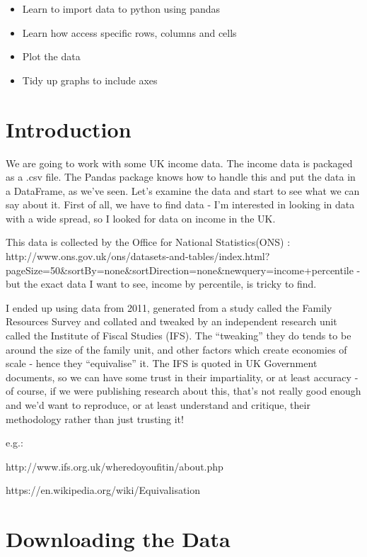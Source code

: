 \documentclass[
  letterpaper,
  DIV=11,
  numbers=noendperiod]{scrreprt}
\providecommand{\tightlist}{%
  \setlength{\itemsep}{0pt}\setlength{\parskip}{0pt}}\usepackage{longtable,booktabs,array}
\begin{document}
\begin{itemize}
\tightlist
\item
  Learn to import data to python using pandas
\item
  Learn how access specific rows, columns and cells
\item
  Plot the data
\item
  Tidy up graphs to include axes
\end{itemize}

\hypertarget{introduction}{%
\section{Introduction}\label{introduction}}

We are going to work with some UK income data. The income data is
packaged as a .csv file. The Pandas package knows how to handle this and
put the data in a DataFrame, as we've seen. Let's examine the data and
start to see what we can say about it. First of all, we have to find
data - I'm interested in looking in data with a wide spread, so I looked
for data on income in the UK.

This data is collected by the Office for National Statistics(ONS) :
http://www.ons.gov.uk/ons/datasets-and-tables/index.html?pageSize=50\&sortBy=none\&sortDirection=none\&newquery=income+percentile
- but the exact data I want to see, income by percentile, is tricky to
find.

I ended up using data from 2011, generated from a study called the
Family Resources Survey and collated and tweaked by an independent
research unit called the Institute of Fiscal Studies (IFS). The
``tweaking'' they do tends to be around the size of the family unit, and
other factors which create economies of scale - hence they
``equivalise'' it. The IFS is quoted in UK Government documents, so we
can have some trust in their impartiality, or at least accuracy - of
course, if we were publishing research about this, that's not really
good enough and we'd want to reproduce, or at least understand and
critique, their methodology rather than just trusting it!

e.g.:

http://www.ifs.org.uk/wheredoyoufitin/about.php

https://en.wikipedia.org/wiki/Equivalisation

\hypertarget{downloading-the-data}{%
\section{Downloading the Data}\label{downloading-the-data}}
\end{document}
